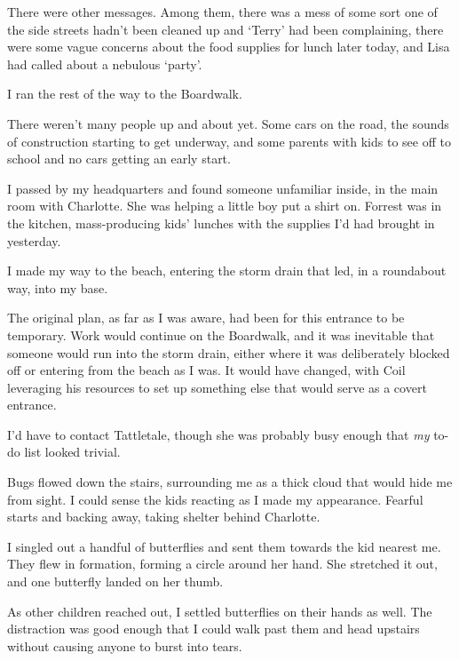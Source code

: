 There were other messages.  Among them, there was a mess of some sort one of the side streets hadn't been cleaned up and `Terry' had been complaining, there were some vague concerns about the food supplies for lunch later today, and Lisa had called about a nebulous `party'.



I ran the rest of the way to the Boardwalk.



There weren't many people up and about yet.  Some cars on the road, the sounds of construction starting to get underway, and some parents with kids to see off to school and no cars getting an early start.



I passed by my headquarters and found someone unfamiliar inside, in the main room with Charlotte.  She was helping a little boy put a shirt on.  Forrest was in the kitchen, mass-producing kids' lunches with the supplies I'd had brought in yesterday.



I made my way to the beach, entering the storm drain that led, in a roundabout way, into my base.



The original plan, as far as I was aware, had been for this entrance to be temporary.  Work would continue on the Boardwalk, and it was inevitable that someone would run into the storm drain, either where it was deliberately blocked off or entering from the beach as I was.  It would have changed, with Coil leveraging his resources to set up something else that would serve as a covert entrance.



I'd have to contact Tattletale, though she was probably busy enough that \emph{my} to-do list looked trivial.



Bugs flowed down the stairs, surrounding me as a thick cloud that would hide me from sight. I could sense the kids reacting as I made my appearance.  Fearful starts and backing away, taking shelter behind Charlotte.



I singled out a handful of butterflies and sent them towards the kid nearest me.  They flew in formation, forming a circle around her hand.  She stretched it out, and one butterfly landed on her thumb.



As other children reached out, I settled butterflies on their hands as well.  The distraction was good enough that I could walk past them and head upstairs without causing anyone to burst into tears.



